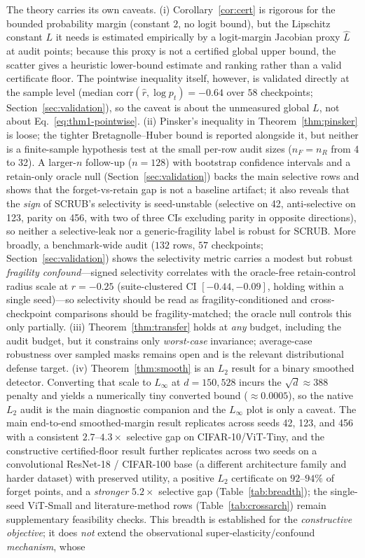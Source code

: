 \documentclass[11pt]{article}
\begin{document}
The theory carries its own caveats. (i) Corollary~\ref{cor:cert} is rigorous for the bounded probability margin (constant $2$, no logit bound), but the Lipschitz constant $L$ it needs is estimated empirically by a logit-margin Jacobian proxy $\hat L$ at audit points; because this proxy is not a certified global upper bound, the scatter gives a heuristic lower-bound estimate and ranking rather than a valid certificate floor. The pointwise inequality itself, however, is validated directly at the sample level (median $\mathrm{corr}(\hat r,\log p_t)=-0.64$ over $58$ checkpoints; Section~\ref{sec:validation}), so the caveat is about the unmeasured global $L$, not about Eq.~\eqref{eq:thm1-pointwise}. (ii) Pinsker's inequality in Theorem~\ref{thm:pinsker} is loose; the tighter Bretagnolle--Huber bound is reported alongside it, but neither is a finite-sample hypothesis test at the small per-row audit sizes ($n_F = n_R$ from 4 to 32). A larger-$n$ follow-up ($n = 128$) with bootstrap confidence intervals and a retain-only oracle null (Section~\ref{sec:validation}) backs the main selective rows and shows that the forget-vs-retain gap is not a baseline artifact; it also reveals that the \emph{sign} of SCRUB's selectivity is seed-unstable (selective on 42, anti-selective on 123, parity on 456, with two of three CIs excluding parity in opposite directions), so neither a selective-leak nor a generic-fragility label is robust for SCRUB. More broadly, a benchmark-wide audit ($132$ rows, $57$ checkpoints; Section~\ref{sec:validation}) shows the selectivity metric carries a modest but robust \emph{fragility confound}---signed selectivity correlates with the oracle-free retain-control radius scale at $r=-0.25$ (suite-clustered CI $[-0.44,-0.09]$, holding within a single seed)---so selectivity should be read as fragility-conditioned and cross-checkpoint comparisons should be fragility-matched; the oracle null controls this only partially. (iii) Theorem~\ref{thm:transfer} holds at \emph{any} budget, including the audit budget, but it constrains only \emph{worst-case} invariance; average-case robustness over sampled masks remains open and is the relevant distributional defense target. (iv) Theorem~\ref{thm:smooth} is an $L_2$ result for a binary smoothed detector. Converting that scale to $L_\infty$ at $d = 150{,}528$ incurs the $\sqrt{d}\approx388$ penalty and yields a numerically tiny converted bound ($\approx 0.0005$), so the native $L_2$ audit is the main diagnostic companion and the $L_\infty$ plot is only a caveat. The main end-to-end smoothed-margin result replicates across seeds 42, 123, and 456 with a consistent $2.7$--$4.3\times$ selective gap on CIFAR-10/ViT-Tiny, and the constructive certified-floor result further replicates across two seeds on a convolutional ResNet-18 / CIFAR-100 base (a different architecture family and harder dataset) with preserved utility, a positive $L_2$ certificate on $92$--$94\%$ of forget points, and a \emph{stronger} $5.2\times$ selective gap (Table~\ref{tab:breadth}); the single-seed ViT-Small and literature-method rows (Table~\ref{tab:crossarch}) remain supplementary feasibility checks. This breadth is established for the \emph{constructive objective}; it does \emph{not} extend the observational super-elasticity/confound \emph{mechanism}, whose 
\end{document}
